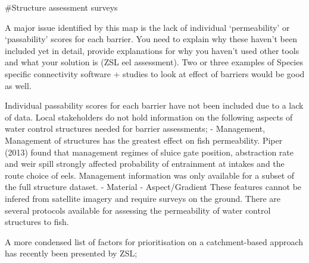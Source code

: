 \documentclass[]{article}
\begin{document}
\#Structure assessment surveys

A major issue identified by this map is the lack of individual
`permeability' or `passability' scores for each barrier. You need to
explain why these haven't been included yet in detail, provide
explanations for why you haven't used other tools and what your solution
is (ZSL eel assessment). Two or three examples of Species specific
connectivity software + studies to look at effect of barriers would be
good as well.

Individual passability scores for each barrier have not been included
due to a lack of data. Local stakeholders do not hold information on the
following aspects of water control structures needed for barrier
assessments; - Management, Management of structures has the greatest
effect on fish permeability. Piper (2013) found that management regimes
of sluice gate position, abstraction rate and weir spill strongly
affected probability of entrainment at intakes and the route choice of
eels. Management information was only available for a subset of the full
structure dataset. - Material - Aspect/Gradient These features cannot be
infered from satellite imagery and require surveys on the ground. There
are several protocols available for assessing the permeability of water
control structures to fish.

A more condensed list of factors for prioritisation on a catchment-based
approach has recently been presented by ZSL;
\end{document}
